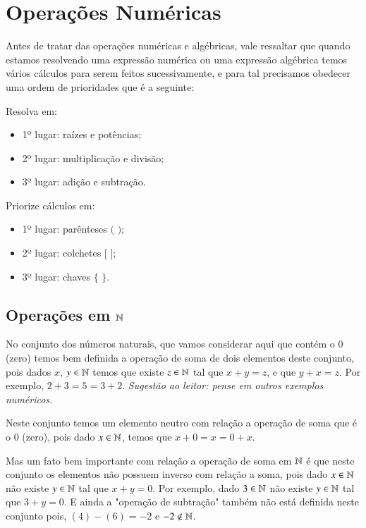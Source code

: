  \chapter{Operações Numéricas}

 Antes de tratar das operações numéricas e algébricas, vale ressaltar que quando estamos resolvendo uma expressão numérica ou uma expressão algébrica temos vários cálculos para serem feitos sucessivamente, e para tal precisamos obedecer uma ordem de prioridades que é a seguinte:

\begin{multicols}{2}
Resolva em:
\begin{itemize}
\item 1º lugar: raízes e potências;
\item 2º lugar: multiplicação e divisão;
\item 3º lugar: adição e subtração.
\end{itemize}

Priorize cálculos em:
\begin{itemize}
\item 1º lugar: parênteses $($ $)$;
\item 2º lugar: colchetes $[$ $]$;
\item 3º lugar: chaves $\{$ $\}$.
\end{itemize}
\end{multicols}

 \section{Operações em \texorpdfstring{$\mathbb{N}$}{N}}
 No conjunto dos números naturais, que vamos considerar aqui que contém o $0$ (zero) temos bem definida a operação de soma de dois elementos deste conjunto, pois dados $x$, $y \in \mathbb{N}$ temos que existe $z \in \mathbb{N}$ tal que $x+y=z$, e que $y+x=z$. Por exemplo, $2+3=5=3+2$. \emph{Sugestão ao leitor: pense em outros exemplos numéricos.}
 
 Neste conjunto temos um elemento neutro com relação a operação de soma que é o $0$ (zero), pois dado $x \in \mathbb{N}$, temos que $x+0=x=0+x$.
 
 Mas um fato bem importante com relação a operação de soma em $\mathbb{N}$ é que neste conjunto os elementos não possuem inverso com relação a soma, pois dado $x \in \mathbb{N}$ não existe $y \in \mathbb{N}$ tal que $x+y=0$. Por exemplo, dado $3 \in \mathbb{N}$ não existe $y \in \mathbb{N}$ tal que $3 + y=0$. E ainda a "operação de subtração" também não está definida neste conjunto pois, $(4)-(6)=-2$ e $-2 \notin \mathbb{N}$.
 
